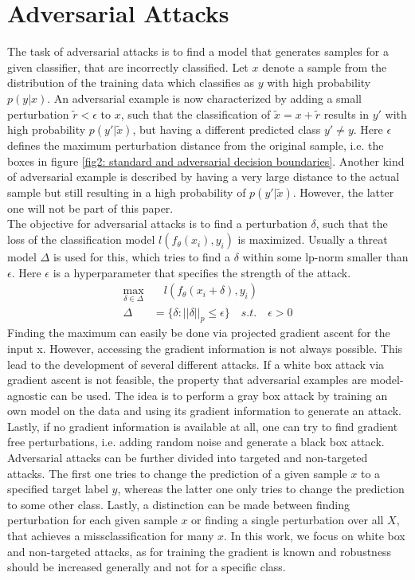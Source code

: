 \documentclass{article}
\begin{document}
\section{Adversarial Attacks}
  
The task of adversarial attacks is to find a model that generates samples for a given classifier, that are incorrectly classified. Let $x$ denote a sample from the distribution of the training data which classifies as $y$ with high probability $p(y|x)$. An adversarial example is now characterized by adding a small perturbation $\tilde{r} < \epsilon$ to $x$, such that the classification of $\tilde{x} = x + \tilde{r}$ results in $y'$ with high probability $p(y'|\tilde{x})$, but having a different predicted class $y' \neq y$. Here $\epsilon$ defines the maximum perturbation distance from the original sample, i.e. the boxes in figure \ref{fig2: standard and adversarial decision boundaries}. Another kind of adversarial example is described by having a very large distance to the actual sample but still resulting in a high probability of $p(y'|\tilde{x})$. However, the latter one will not be part of this paper. \\
The objective for adversarial attacks is to find a perturbation $\delta$, such that the loss of the classification model $l(f_{\theta}(x_i), y_i)$ is maximized. Usually a threat model $\Delta$ is used for this, which tries to find a $\delta$ within some lp-norm smaller than $\epsilon$. Here $\epsilon$ is a hyperparameter that specifies the strength of the attack. 
\vspace{-0.2cm}
\begin{align*}
  \max_{\delta \in \Delta} & \quad l(f_{\theta}(x_i + \delta), y_i)  \\
  \Delta &= \{\delta : ||\delta||_p \leq \epsilon\} \quad s.t. \quad \epsilon > 0
\end{align*}
Finding the maximum can easily be done via projected gradient ascent for the input x. However, accessing the gradient information is not always possible. This lead to the development of several different attacks. If a white box attack via gradient ascent is not feasible, the property that adversarial examples are model-agnostic can be used. The idea is to perform a gray box attack by training an own model on the data and using its gradient information to generate an attack. Lastly, if no gradient information is available at all, one can try to find gradient free perturbations, i.e. adding random noise and generate a black box attack. \\
Adversarial attacks can be further divided into targeted and non-targeted attacks. The first one tries to change the prediction of a given sample $x$ to a specified target label $y$, whereas the latter one only tries to change the prediction to some other class. Lastly, a distinction can be made between finding perturbation for each given sample $x$ or finding a single perturbation over all $X$, that achieves a missclassification for many $x$. In this work, we focus on white box and non-targeted attacks, as for training the gradient is known and robustness should be increased generally and not for a specific class. 
  
\end{document}
